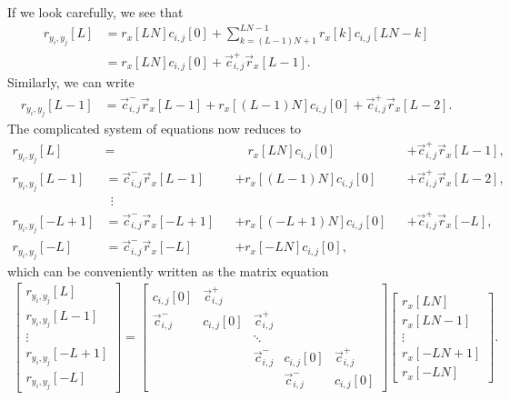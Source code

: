 \documentclass[a4paper, openany, oneside]{memoir}
\begin{document}
If we look carefully, we see that
\begin{align*}
    r_{y_i,y_j}[L] &= r_x[LN]c_{i,j}[0] + \sum_{k=(L-1)N+1}^{LN-1}r_x[k]c_{i,j}[LN-k] \\
    &=r_x[LN]c_{i,j}[0] + \vec{c}_{i,j}^+ \vec{r}_x[L-1].
\end{align*}
Similarly, we can write
\begin{align*}
    r_{y_i,y_j}[L-1] &= \vec{c}_{i,j}^{-} \vec{r}_x[L-1] + r_x[(L-1)N] c_{i,j}[0] + \vec{c}_{i,j}^{+} \vec{r}_x[L-2].
\end{align*}
The complicated system of equations now reduces to
\begin{align*}
    r_{y_i,y_j}[L] &= &&\hspace{12pt}r_x[LN] c_{i,j}[0] &&+ \vec{c}_{i,j}^+ \vec{r}_x[L-1] , \\
    r_{y_i,y_j}[L-1] &= \vec{c}_{i,j}^{-} \vec{r}_x[L-1] &&+ r_x[(L-1)N] c_{i,j}[0] &&+ \vec{c}_{i,j}^{+} \vec{r}_x[L-2], \\
    &~~\vdots \\
    r_{y_i,y_j}[-L+1] &= \vec{c}_{i,j}^{-}\vec{r}_x[-L+1] &&+ r_x[(-L+1)N] c_{i,j}[0] &&+ \vec{c}_{i,j}^{+}\vec{r}_x[-L], \\
    r_{y_i,y_j}[-L] &= \vec{c}_{i,j}^{-} \vec{r}_x[-L] &&+ r_x[-LN] c_{i,j}[0],
\end{align*}
which can be conveniently written as the matrix equation
\begin{align*}
    \begin{bmatrix}
        r_{y_i,y_j}[L] \\
        r_{y_i,y_j}[L-1] \\
        \vdots \\
        r_{y_i,y_j}[-L+1] \\
        r_{y_i,y_j}[-L]
    \end{bmatrix} = \begin{bmatrix}
        c_{i,j}[0] & \vec{c}^+_{i,j} \\
        \vec{c}^{-}_{i,j} & c_{i,j}[0] & \vec{c}^{+}_{i,j} \\
        &&\ddots \\
        &&\vec{c}^{-}_{i,j} & c_{i,j}[0] & \vec{c}^{+}_{i,j} \\
        &&&\vec{c}^{-}_{i,j} & c_{i,j}[0]
    \end{bmatrix} \begin{bmatrix}
        r_x[LN] \\
        r_x[LN-1] \\
        \vdots \\
        r_x[-LN+1] \\
        r_x[-LN]
    \end{bmatrix}.
\end{align*}
\end{document}
